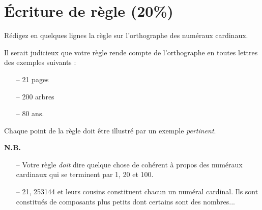 \documentclass[a4paper,12pt]{article}
\begin{document}
\section{\textbf{Écriture de règle} (20\%)}
\noindent
Rédigez en quelques lignes la règle sur l'orthographe des numéraux cardinaux.
\smallskip	

\noindent
Il serait judicieux que votre règle rende compte de l'orthographe en toutes lettres des exemples suivants :
\begin{itemize}
\item[--] 21 pages
\item[--] 200 arbres
\item[--] 80 ans.
\end{itemize}

\noindent
Chaque point de la règle doit être illustré par un exemple \emph{pertinent}.
\smallskip	

\noindent
\textbf{N.B.}
\begin{itemize}
\item [--] Votre règle \emph{doit} dire quelque chose de cohérent à propos des numéraux cardinaux qui se terminent par 1, 20 et 100.
\item [--] 21, 253144 et leurs cousins constituent chacun un numéral cardinal. Ils sont constitués de composants plus petits dont certains sont des nombres...
\end{itemize}
\end{document}
